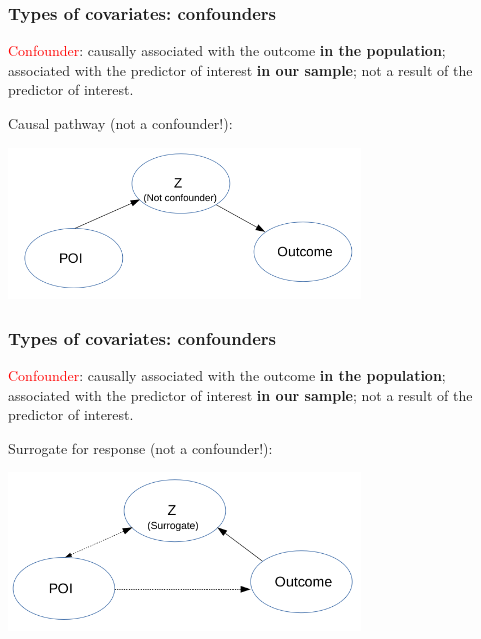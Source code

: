 \documentclass[12pt, 
hyperref={colorlinks=true, linkcolor=blue, urlcolor=cyan}]{beamer}
\begin{document}
\begin{frame}
\frametitle{Types of covariates: confounders}
\textcolor{red}{Confounder}: causally associated with the outcome \textbf{in the population}; associated with the predictor of interest \textbf{in our sample}; not a result of the predictor of interest.

Causal pathway (not a confounder!):

\begin{center}
\includegraphics[width=0.7\textwidth]{plots/causal_pathway.png}
\end{center}

\end{frame}

\begin{frame}
\frametitle{Types of covariates: confounders}
\textcolor{red}{Confounder}: causally associated with the outcome \textbf{in the population}; associated with the predictor of interest \textbf{in our sample}; not a result of the predictor of interest.

Surrogate for response (not a confounder!):

\begin{center}
\includegraphics[width=0.7\textwidth]{plots/surrogate.png}
\end{center}

\end{frame}
\end{document}

